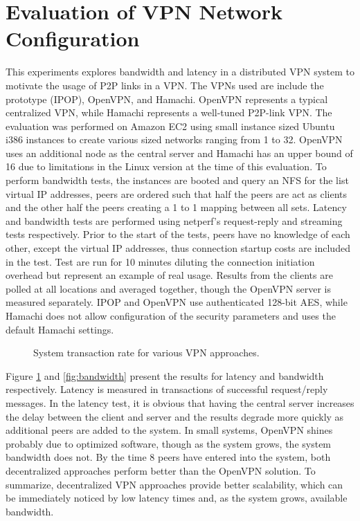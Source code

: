 \section{Evaluation of VPN Network Configuration}

This experiments explores bandwidth and latency in a distributed VPN system to
motivate the usage of P2P links in a VPN.  The VPNs used are include the
prototype (IPOP), OpenVPN, and Hamachi.  OpenVPN represents a typical
centralized VPN, while Hamachi represents a well-tuned P2P-link VPN.  The
evaluation was performed on Amazon EC2 using small instance sized Ubuntu i386
instances to create various sized networks ranging from 1 to 32.  OpenVPN uses
an additional node as the central server and Hamachi has an upper bound of 16
due to limitations in the Linux version at the time of this evaluation.  To
perform bandwidth tests, the instances are booted and query an NFS for the list
virtual IP addresses, peers are ordered such that half the peers are act as
clients and the other half the peers creating a 1 to 1 mapping between all
sets.  Latency and bandwidth tests are performed using netperf's request-reply
and streaming tests respectively.  Prior to the start of the tests, peers have
no knowledge of each other, except the virtual IP addresses, thus connection
startup costs are included in the test.  Test are run for 10 minutes diluting
the connection initiation overhead but represent an example of real usage.
Results from the clients are polled at all locations and averaged together,
though the OpenVPN server is measured separately.  IPOP and OpenVPN use
authenticated 128-bit AES, while Hamachi does not allow configuration of the
security parameters and uses the default Hamachi settings.

\begin{figure}
\centering
{}
\caption{System transaction rate for various VPN approaches.}
\label{fig:latency}
\end{figure}

Figure \ref{fig:latency} and \ref{fig:bandwidth} present the results for latency
and bandwidth respectively.  Latency is measured in transactions of successful
request/reply messages.  In the latency test, it is obvious that having the
central server increases the delay between the client and server and the results
degrade more quickly as additional peers are added to the system.  In small
systems, OpenVPN shines probably due to optimized software, though as the system
grows, the system bandwidth does not.  By the time 8 peers have entered into
the system, both decentralized approaches perform better than the OpenVPN
solution.  To summarize, decentralized VPN approaches provide better
scalability, which can be immediately noticed by low latency times and, as the
system grows, available bandwidth.


